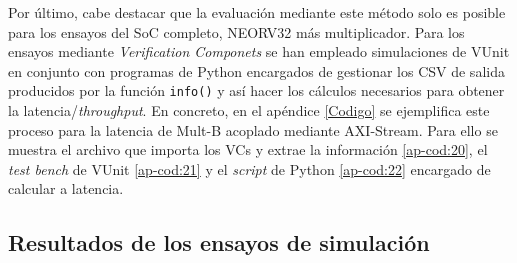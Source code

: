Por último, cabe destacar que la evaluación mediante este método solo es posible para los ensayos del SoC completo, NEORV32 más multiplicador.
Para los ensayos mediante \textit{Verification Componets} se han empleado simulaciones de VUnit en conjunto con programas de Python encargados de gestionar los CSV de salida producidos por la función \texttt{info()} y así hacer los cálculos necesarios para obtener la latencia/\textit{throughput}.
En concreto, en el apéndice \ref{Codigo} se ejemplifica este proceso para la latencia de Mult-B acoplado mediante AXI-Stream.
Para ello se muestra el archivo que importa los VCs y extrae la información \ref{ap-cod:20}, el \textit{test bench} de VUnit \ref{ap-cod:21} y el \textit{script} de Python \ref{ap-cod:22} encargado de calcular a latencia.

\subsection{Resultados de los ensayos de simulación}


